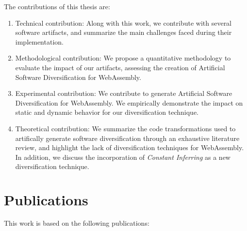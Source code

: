 The contributions of this thesis are:

\begin{enumerate}[label=\subscript{C}{{\arabic*}}]
    \item Technical contribution: Along with this work, we contribute with several software artifacts, and summarize the main challenges faced during their implementation.
    
    \item Methodological contribution: We propose a quantitative methodology to evaluate the impact of our artifacts, assessing the creation of Artificial Software Diversification for WebAssembly.  
    
    \item Experimental contribution: We contribute to generate Artificial Software Diversification for WebAssembly. We empirically demonstrate the impact on static and dynamic behavior for our diversification technique.
    
    \item Theoretical contribution: We summarize the code transformations used to artifically generate software diversification through an exhaustive literature review, and highlight the lack of diversification techniques for WebAssembly. In addition, we discuss the incorporation of \emph{Constant Inferring} as a new diversification technique.
\end{enumerate}

\section{Publications}

This work is based on the following publications:

